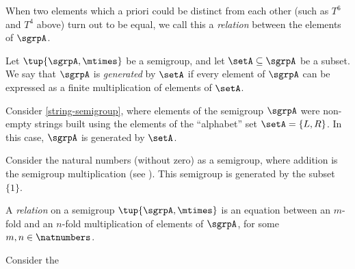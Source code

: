 When two elements which a priori could be distinct from each other (such as $T^6$ and $T^4$ above) turn out to be equal, we call this a \emph{relation} between the elements of $\sgrpA$.

\begin{definition}
Let $\tup{\sgrpA, \mtimes}$ be a semigroup, and let $\setA \subseteq \sgrpA$ be a subset. We say that $\sgrpA$ is \emph{generated} by $\setA$ if every element of $\sgrpA$ can be expressed as a finite multiplication of elements of $\setA$.
\end{definition}

\begin{example}
Consider \cref{string-semigroup}, where elements of the semigroup $\sgrpA$ were non-empty strings built using the elements of the ``alphabet'' set $\setA = \{ L, R \}$. In this case, $\sgrpA$ is generated by $\setA$.
\end{example}


\begin{example}
Consider the natural numbers (without zero) as a semigroup, where addition is the semigroup multiplication (see \label{natnum-semigroup}). This semigroup is generated by the subset $\{1 \}$.
\end{example}

\begin{definition}
A \emph{relation} on a semigroup $\tup{\sgrpA, \mtimes}$ is an equation between an $m$-fold and an $n$-fold multiplication of elements of $\sgrpA$, for some $m, n \in \natnumbers$.
\end{definition}

\begin{example}
Consider the
\end{example}


\


